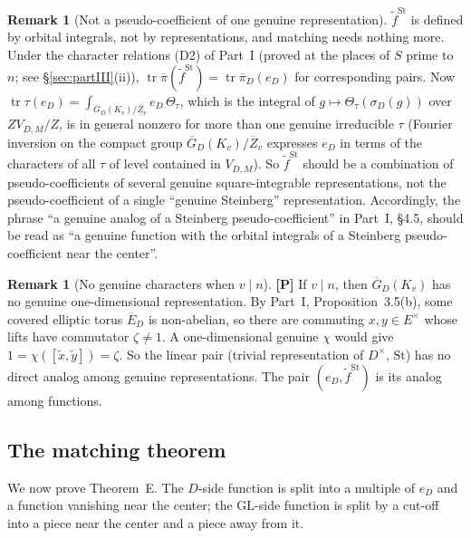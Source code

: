 \documentclass[12pt]{article}
\newcommand{\ov}[1]{\overline{#1}}
\newcommand{\tr}{\operatorname{tr}}
\newcommand{\GL}{\mathrm{GL}}
\newcommand{\St}{\mathrm{St}}
\newcommand{\Zb}{\ov{Z}}
\newcommand{\GDb}{\ov{G}_D}
\newcommand{\pib}{\ov{\pi}}
\newcommand{\Eb}{\ov{E}}
\newcommand{\sg}{\sigma}
\newcommand{\Pv}{\textbf{[P]}}
\theoremstyle{plain}
\theoremstyle{definition}
\newtheorem{remark}[theorem]{Remark}
\begin{document}
\begin{remark}[Not a pseudo-coefficient of one genuine representation]\label{rem:notpc}
$\tilde f^{\St}$ is defined by orbital integrals, not by representations, and matching needs nothing more. Under the character relations (D2) of Part~I (proved at the places of $S$ prime to $n$; see \S\ref{sec:partIII}(ii)), $\tr\pib(\tilde f^{\St})=\tr\pib_D(e_D)$ for corresponding pairs. Now $\tr\tau(e_D)=\int_{\GDb(K_v)/\Zb_v}e_D\,\Theta_\tau$, which is the integral of $g\mapsto\Theta_\tau(\sg_D(g))$ over $ZV_{D,M}/Z$, is in general nonzero for more than one genuine irreducible $\tau$ (Fourier inversion on the compact group $\GDb(K_v)/\Zb_v$ expresses $e_D$ in terms of the characters of all $\tau$ of level contained in $V_{D,M}$). So $\tilde f^{\St}$ should be a combination of pseudo-coefficients of several genuine square-integrable representations, not the pseudo-coefficient of a single ``genuine Steinberg'' representation. Accordingly, the phrase ``a genuine analog of a Steinberg pseudo-coefficient'' in Part~I, \S4.5, should be read as ``a genuine function with the orbital integrals of a Steinberg pseudo-coefficient near the center''.
\end{remark}

\begin{remark}[No genuine characters when $v\mid n$]\label{rem:nochar}\Pv
If $v\mid n$, then $\GDb(K_v)$ has no genuine one-dimensional representation. By Part~I, Proposition~3.5(b), some covered elliptic torus $\Eb_D$ is non-abelian, so there are commuting $x,y\in E^\times$ whose lifts have commutator $\zeta\ne1$. A one-dimensional genuine $\chi$ would give $1=\chi([\tilde x,\tilde y])=\zeta$. So the linear pair (trivial representation of $D^\times$, $\St$) has no direct analog among genuine representations. The pair $(e_D,\tilde f^{\St})$ is its analog among functions.
\end{remark}


\subsection{The matching theorem}\label{subsec:matchthm}
We now prove Theorem~E. The $D$-side function is split into a multiple of $e_D$ and a function vanishing near the center; the $\GL$-side function is split by a cut-off into a piece near the center and a piece away from it.
\end{document}
